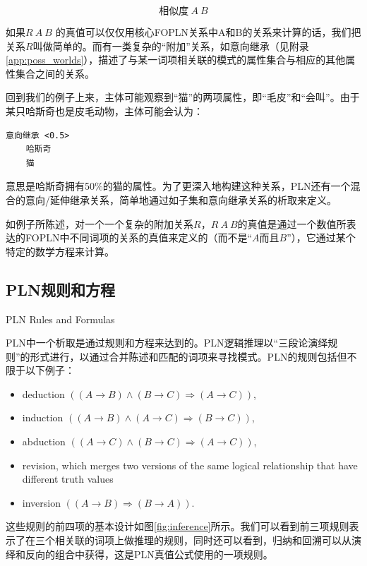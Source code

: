 $$
相似度 \ A \ B
$$

如果$R \ A \ B$ 的真值可以仅仅用核心FOPLN关系中A和B的关系来计算的话，我们把关系$R$叫做简单的。而有一类复杂的“附加”关系，如意向继承（见附录\ref{app:poss_worlds}），描述了与某一词项相关联的模式的属性集合与相应的其他属性集合之间的关系。

回到我们的例子上来，主体可能观察到“猫”的两项属性，即“毛皮”和“会叫”。由于某只哈斯奇也是皮毛动物，主体可能会认为：

{\tt\begin{small}\begin{lstlisting}
意向继承 <0.5>
	哈斯奇  
	猫
\end{lstlisting}\end{small}}

意思是哈斯奇拥有50\%的猫的属性。为了更深入地构建这种关系，PLN还有一个混合的意向/延伸继承关系，简单地通过如子集和意向继承关系的析取来定义。

如例子所陈述，对一个一个复杂的附加关系$R$，$R \ A \ B$的真值是通过一个数值所表达的FOPLN中不同词项的关系的真值来定义的（而不是“$A$而且$B$”），它通过某个特定的数学方程来计算。

\subsection{PLN规则和方程}{PLN Rules and Formulas}

PLN中一个析取是通过规则和方程来达到的。PLN逻辑推理以“三段论演绎规则”的形式进行，以通过合并陈述和匹配的词项来寻找模式。PLN的规则包括但不限于以下例子：

\begin{itemize}
\item deduction $\left((A\rightarrow B) \wedge (B\rightarrow C) \Rightarrow (A\rightarrow C)\right)$,
\item induction $\left((A\rightarrow B) \wedge (A\rightarrow C) \Rightarrow
(B\rightarrow C)\right)$,
\item abduction $\left((A\rightarrow C) \wedge (B\rightarrow C) \Rightarrow
(A\rightarrow C)\right)$,
  \item revision, which merges two versions of the same logical relationship that have different truth values
\item inversion $\left((A\rightarrow B) \Rightarrow
  (B\rightarrow A)\right)$.
\end{itemize}

这些规则的前四项的基本设计如图\ref{fig:inference}所示。我们可以看到前三项规则表示了在三个相关联的词项上做推理的规则，同时还可以看到，归纳和回溯可以从演绎和反向的组合中获得，这是PLN真值公式使用的一项规则。

